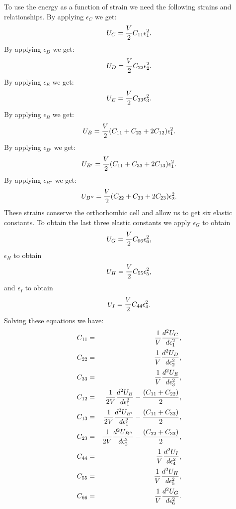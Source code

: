 \documentclass[12pt,a4paper,twoside]{report}
\begin{document}
To use the energy as a function of strain we need the following strains
and relationships. 
By applying $\epsilon_C$ we get:
\begin{equation}
U_C= {V \over 2} C_{11} \epsilon_1^2.
\end{equation}
By applying $\epsilon_D$ we get:
\begin{equation}
U_D= {V \over 2} C_{22} \epsilon_2^2.
\end{equation}
By applying $\epsilon_E$ we get:
\begin{equation}
U_E= {V \over 2} C_{33} \epsilon_3^2.
\end{equation}
By applying $\epsilon_B$ we get:
\begin{equation}
U_B= {V \over 2} (C_{11} + C_{22} + 2 C_{12}) \epsilon_1^2.
\end{equation}
By applying $\epsilon_{B'}$ we get: 
\begin{equation}
U_{B'}= {V \over 2} (C_{11} + C_{33} + 2 C_{13}) \epsilon_1^2.
\end{equation}
By applying $\epsilon_{B''}$ we get:
\begin{equation}
U_{B''}= {V \over 2} (C_{22} + C_{33} + 2 C_{23}) \epsilon_2^2.
\end{equation}
These strains conserve the orthorhombic cell and allow us to get
six elastic constants. To obtain the last three elastic constants we 
apply $\epsilon_G$ to obtain
\begin{equation}
U_G= {V \over 2} C_{66} \epsilon_6^2,
\end{equation}
$\epsilon_H$ to obtain
\begin{equation}
U_H= {V \over 2} C_{55} \epsilon_5^2,
\end{equation}
and $\epsilon_I$ to obtain
\begin{equation}
U_I= {V \over 2} C_{44} \epsilon_4^2.
\end{equation}
Solving these equations we have:
\begin{eqnarray}
C_{11}&=&{1 \over V} {d^2 U_C \over d \epsilon_1^2}, \\ 
C_{22}&=&{1 \over V} {d^2 U_D \over d \epsilon_2^2}, \\ 
C_{33}&=&{1 \over V} {d^2 U_E \over d \epsilon_3^2}, \\ 
C_{12}&=&{1 \over 2 V} {d^2 U_B \over d \epsilon_1^2} - 
{(C_{11}+C_{22})\over 2}, \\
C_{13}&=&{1 \over 2 V} {d^2 U_{B'} \over d \epsilon_1^2} - 
{(C_{11}+C_{33})\over 2}, \\
C_{23}&=&{1 \over 2 V} {d^2 U_{B''} \over d \epsilon_2^2} - 
{(C_{22}+C_{33})\over 2}, \\
C_{44}&=&{1 \over V} {d^2 U_I \over d \epsilon_4^2}, \\
C_{55}&=&{1 \over V} {d^2 U_H \over d \epsilon_5^2}, \\
C_{66}&=&{1 \over V} {d^2 U_G \over d \epsilon_6^2}.
\end{eqnarray}
\end{document}
